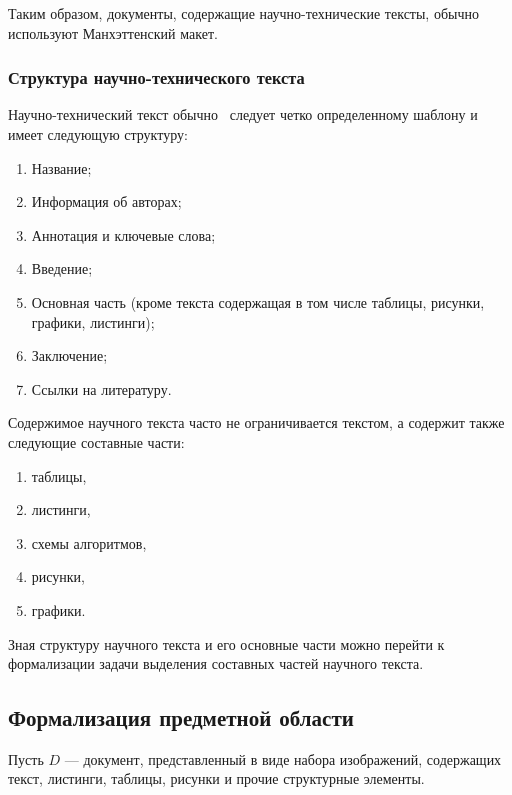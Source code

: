 Таким образом, документы, содержащие научно-технические тексты, обычно используют Манхэттенский макет.

\subsubsection{Структура научно-технического текста}

Научно-технический текст обычно~\cite{butenko2022, romanov2014, raitskaya2019} следует четко определенному шаблону и имеет следующую структуру:
\begin{enumerate}
    \item Название;
    \item Информация об авторах;
    \item Аннотация и ключевые слова;
    \item Введение;
    \item Основная часть (кроме текста содержащая в том числе таблицы, рисунки, графики, листинги);
    \item Заключение;
    \item Ссылки на литературу.
\end{enumerate}

Содержимое научного текста часто не ограничивается текстом, а содержит также следующие составные части:
\begin{enumerate}
    \item таблицы,
    \item листинги,
    \item схемы алгоритмов,
    \item рисунки,
    \item графики.
\end{enumerate}

%

Зная структуру научного текста и его основные части можно перейти к формализации задачи выделения составных частей научного текста.

\subsection{Формализация предметной области}

Пусть $ D $ --- документ, представленный в виде набора изображений, содержащих текст, листинги, таблицы, рисунки и прочие структурные элементы.

